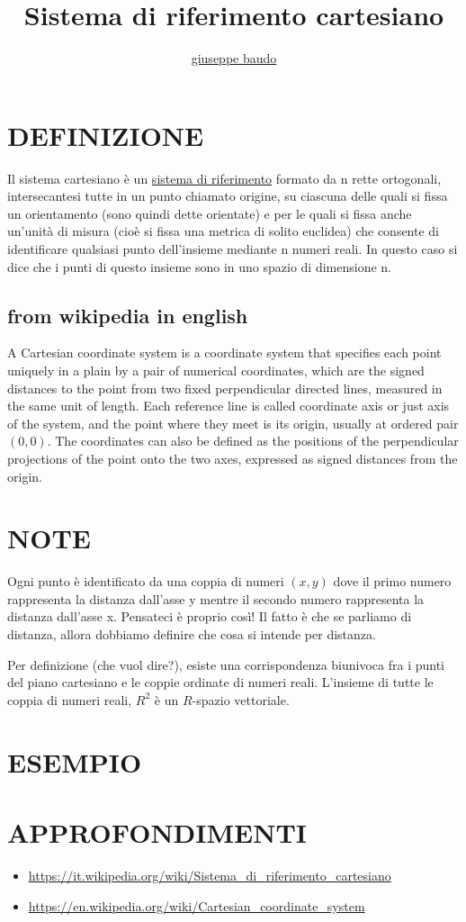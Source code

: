 \documentclass[a4paper,10pt]{article}
\title{Sistema di riferimento cartesiano}
\author{\href{http://www.baudo.hol.es}{giuseppe baudo}}
\begin{document}
\maketitle

\section{DEFINIZIONE}
Il sistema cartesiano \`{e} un \href{SistemaRiferimento.html}{sistema di riferimento} formato da n rette ortogonali, intersecantesi tutte in un punto
chiamato origine, su ciascuna delle quali si fissa un orientamento (sono quindi dette orientate) e per le quali si fissa
anche un'unità di misura (cioè si fissa una metrica di solito euclidea) che consente di identificare qualsiasi punto dell'insieme
mediante n numeri reali. In questo caso si dice che i punti di questo insieme sono in uno spazio di dimensione n.

\subsection{from wikipedia in english}
A Cartesian coordinate system is a coordinate system that specifies each point uniquely in a plain by a pair of numerical coordinates,
which are the signed distances to the point from two fixed perpendicular directed lines, measured in the same unit of length.
Each reference line is called coordinate axis or just axis of the system, and the point where they meet is its origin, usually at
ordered pair $(0, 0)$. The coordinates can also be defined as the positions of the perpendicular projections of the point onto the
two axes, expressed as signed distances from the origin.

\section{NOTE}
Ogni punto è identificato da una coppia di numeri $(x,y)$ dove il primo numero rappresenta la distanza dall'asse y mentre il secondo
numero rappresenta la distanza dall'asse x. Pensateci è proprio così! Il fatto è che se parliamo di distanza, allora dobbiamo definire
che cosa si intende per distanza.

Per definizione (che vuol dire?), esiste una corrispondenza biunivoca fra i punti del piano cartesiano e le coppie ordinate di 
numeri reali. L'insieme di tutte le coppia di numeri reali, $R^2$ è un $R$-spazio vettoriale.

\section{ESEMPIO}

\section{APPROFONDIMENTI}
\begin{itemize}
 \item \url{https://it.wikipedia.org/wiki/Sistema_di_riferimento_cartesiano}
 \item \url{https://en.wikipedia.org/wiki/Cartesian_coordinate_system}
\end{itemize}
\end{document}

